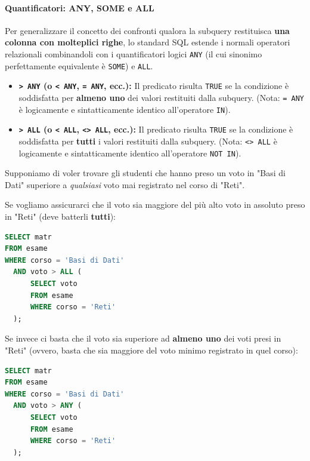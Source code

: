 \paragraph{Quantificatori: ANY, SOME e ALL}

Per generalizzare il concetto dei confronti qualora la subquery restituisca \textbf{una colonna con molteplici righe}, lo standard SQL estende i normali operatori relazionali combinandoli con i quantificatori logici \texttt{ANY} (il cui sinonimo perfettamente equivalente è \texttt{SOME}) e \texttt{ALL}.

\begin{itemize}
    \item \textbf{\texttt{> ANY} (o \texttt{< ANY}, \texttt{= ANY}, ecc.):} Il predicato risulta \texttt{TRUE} se la condizione è soddisfatta per \textbf{almeno uno} dei valori restituiti dalla subquery. (Nota: \texttt{= ANY} è logicamente e sintatticamente identico all'operatore \texttt{IN}).
    \item \textbf{\texttt{> ALL} (o \texttt{< ALL}, \texttt{<> ALL}, ecc.):} Il predicato risulta \texttt{TRUE} se la condizione è soddisfatta per \textbf{tutti} i valori restituiti dalla subquery. (Nota: \texttt{<> ALL} è logicamente e sintatticamente identico all'operatore \texttt{NOT IN}).
\end{itemize}

\begin{example}
Supponiamo di voler trovare gli studenti che hanno preso un voto in "Basi di Dati" superiore a \textit{qualsiasi} voto mai registrato nel corso di "Reti". 

Se vogliamo assicurarci che il voto sia maggiore del più alto voto in assoluto preso in "Reti" (deve batterli \textbf{tutti}):
\begin{lstlisting}[language=SQL, basicstyle=\ttfamily\small, keywordstyle=\color{blue}\bfseries]
SELECT matr
FROM esame
WHERE corso = 'Basi di Dati' 
  AND voto > ALL (
      SELECT voto
      FROM esame
      WHERE corso = 'Reti'
  );
\end{lstlisting}

Se invece ci basta che il voto sia superiore ad \textbf{almeno uno} dei voti presi in "Reti" (ovvero, basta che sia maggiore del voto minimo registrato in quel corso):
\begin{lstlisting}[language=SQL, basicstyle=\ttfamily\small, keywordstyle=\color{blue}\bfseries]
SELECT matr
FROM esame
WHERE corso = 'Basi di Dati' 
  AND voto > ANY (
      SELECT voto
      FROM esame
      WHERE corso = 'Reti'
  );
\end{lstlisting}
\end{example}

